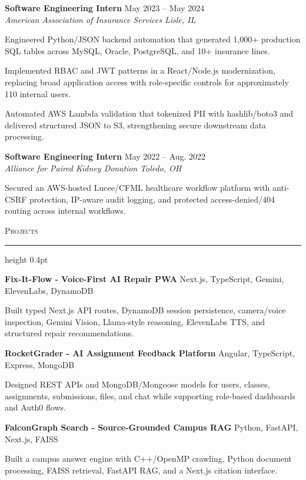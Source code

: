 \documentclass[letterpaper,11pt]{article}
\newcommand{\resumesection}[1]{%
  \par\vspace{2pt}%
  {\large\scshape #1}\par\vspace{2pt}%
  \hrule height 0.4pt\vspace{2pt}%
}
\newcommand{\resumeSubheading}[4]{
  \textbf{#1} \hfill #2\\
  \textit{#3} \hfill \textit{#4}
}
\newcommand{\projectHeading}[2]{
  \textbf{#1} \hfill #2
}
\begin{document}
\resumeSubheading
{Software Engineering Intern}{May 2023 -- May 2024}
{American Association of Insurance Services}{Lisle, IL}
\begin{tightitemize}
  \item Engineered Python/JSON backend automation that generated 1,000+ production SQL tables across MySQL, Oracle, PostgreSQL, and 10+ insurance lines.
  \item Implemented RBAC and JWT patterns in a React/Node.js modernization, replacing broad application access with role-specific controls for approximately 110 internal users.
  \item Automated AWS Lambda validation that tokenized PII with hashlib/boto3 and delivered structured JSON to S3, strengthening secure downstream data processing.
\end{tightitemize}

\resumeSubheading
{Software Engineering Intern}{May 2022 -- Aug. 2022}
{Alliance for Paired Kidney Donation}{Toledo, OH}
\begin{tightitemize}
  \item Secured an AWS-hosted Lucee/CFML healthcare workflow platform with anti-CSRF protection, IP-aware audit logging, and protected access-denied/404 routing across internal workflows.
\end{tightitemize}

\resumesection{Projects}
\projectHeading{Fix-It-Flow - Voice-First AI Repair PWA}{Next.js, TypeScript, Gemini, ElevenLabs, DynamoDB}
\begin{tightitemize}
  \item Built typed Next.js API routes, DynamoDB session persistence, camera/voice inspection, Gemini Vision, Llama-style reasoning, ElevenLabs TTS, and structured repair recommendations.
\end{tightitemize}

\projectHeading{RocketGrader - AI Assignment Feedback Platform}{Angular, TypeScript, Express, MongoDB}
\begin{tightitemize}
  \item Designed REST APIs and MongoDB/Mongoose models for users, classes, assignments, submissions, files, and chat while supporting role-based dashboards and Auth0 flows.
\end{tightitemize}

\projectHeading{FalconGraph Search - Source-Grounded Campus RAG}{Python, FastAPI, Next.js, FAISS}
\begin{tightitemize}
  \item Built a campus answer engine with C++/OpenMP crawling, Python document processing, FAISS retrieval, FastAPI RAG, and a Next.js citation interface.
\end{tightitemize}
\end{document}

